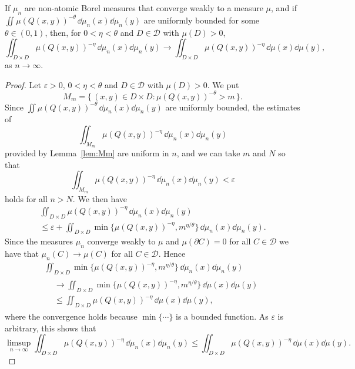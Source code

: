 \begin{coro}\label{cor:energyconvergence}
If $\mu_n$ are non-atomic Borel measures that converge weakly to a measure $\mu$, and if $\iint \mu (Q(x,y))^{-\theta} \, \dd
\mu_n (x) \dd \mu_n (y)$ are uniformly bounded for some $\theta \in (0,1)$, then, for $0 < \eta < \theta$ and $D \in
\mathscr{D}$ with $\mu (D) > 0$,
\[
\iint_{D \times D} \mu (Q(x,y))^{-\eta} \, \dd \mu_n (x)
\dd \mu_n (y) \to \iint_{D \times D} \mu (Q(x,y))^{-\eta} \,
\dd \mu (x) \dd \mu (y),
\]
as $n \to \infty$.
\end{coro}

\begin{proof}
Let $\varepsilon > 0$, $0 < \eta < \theta$ and $D \in
\mathscr{D}$ with $\mu (D) > 0$. We put
\[
M_m = \{\, (x,y) \in D \times D: \mu (Q(x,y))^{-\theta} > m \,\}.
\]
Since $\iint \mu (Q(x,y))^{-\theta} \, \dd \mu_n (x)
\dd \mu_n (y)$ are uniformly bounded, the estimates of
\[
\iint_{M_m} \mu (Q (x,y))^{-\eta} \, \dd \mu_n (x) \dd
\mu_n (y)
\]
provided by Lemma~\ref{lem:Mm} are uniform in $n$, and we can take $m$ and $N$ so that
\[
\iint_{M_m} \mu (Q (x,y))^{-\eta} \, \dd \mu_n (x) \dd
\mu_n (y) < \varepsilon
\]
holds for all $n > N$. We then have
\begin{multline*}
\iint_{D \times D} \mu (Q (x,y))^{-\eta} \, \dd\mu_n (x)
\dd\mu_n (y) \\ \leq \varepsilon + \iint_{D \times D} \min \{
\mu(Q (x,y))^{-\eta}, m^{\eta/\theta} \} \, \dd\mu_n (x)
\dd \mu_n (y).
\end{multline*}
Since the measures $\mu_n$ converge weakly to $\mu$ and $\mu (\partial C) = 0$ for all $C \in \mathscr{D}$ we have that $\mu_n (C) \to \mu (C)$ for all $C \in \mathscr{D}$. Hence
\begin{multline*}
\iint_{D \times D} \min \{ \mu(Q (x,y))^{-\eta}, m^{\eta/\theta} \} \,
\dd\mu_n (x) \dd \mu_n (y) \\
\begin{aligned}
&\to \iint_{D \times D} \min \{
\mu(Q (x,y))^{-\eta}, m^{\eta/\theta} \} \, \dd\mu (x) \dd \mu (y)\\
&\leq \iint_{D \times D} \mu(Q (x,y))^{-\eta} \, \dd \mu (x)
\dd \mu (y),
\end{aligned}
\end{multline*}
where the convergence holds because $\min \{ \cdots \}$ is a bounded function. As $\varepsilon$ is arbitrary, this shows that
\[
\limsup_{n\to \infty} \iint_{D \times D} \mu (Q (x,y))^{-\eta} \,
\dd \mu_n (x) \dd \mu_n (y) \leq \iint_{D \times D} \mu(Q (x,y))^{-\eta} \, \dd\mu (x) \dd \mu (y).
\]


\end{proof}
